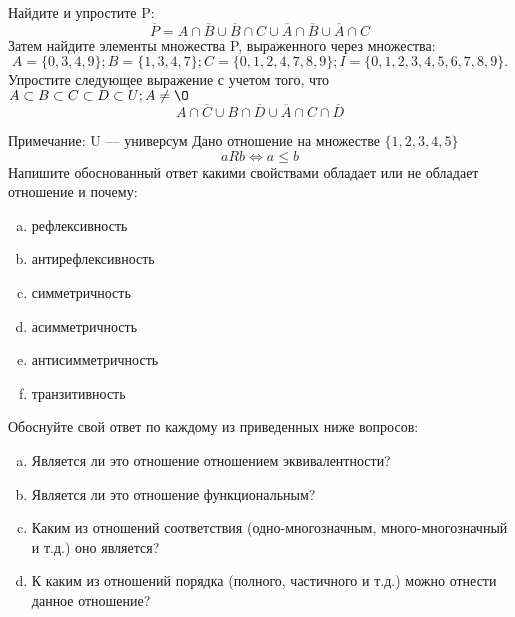 \documentclass[10pt]{exam}
\begin{document}
\begin{questions}
\question
Найдите и упростите P:
\begin{equation*}
\overline{P} = A \cap \overline{B} \cup \overline{B} \cap C \cup \overline{A} \cap \overline{B} \cup \overline{A} \cap C
\end{equation*}
Затем найдите элементы множества P, выраженного через множества:
\begin{equation*}
A = \{0, 3, 4, 9\}; 
B = \{1, 3, 4, 7\};
C = \{0, 1, 2, 4, 7, 8, 9\};
I = \{0, 1, 2, 3, 4, 5, 6, 7, 8, 9\}.
\end{equation*}\question
Упростите следующее выражение с учетом того, что $A\subset B \subset C \subset D \subset U; A \neq \O$
\begin{equation*}
A \cap  \overline{C} \cup B \cap \overline{D} \cup  \overline{A} \cap C \cap  \overline{D}
\end{equation*}

Примечание: U — универсум\question
Дано отношение на множестве $\{1, 2, 3, 4, 5\}$ 
\begin{equation*}
aRb \iff a \leq b
\end{equation*}
Напишите обоснованный ответ какими свойствами обладает или не обладает отношение и почему:   
\begin{enumerate} [a)]\setcounter{enumi}{0}
\item рефлексивность
\item антирефлексивность
\item симметричность
\item асимметричность
\item антисимметричность
\item транзитивность
\end{enumerate}

Обоснуйте свой ответ по каждому из приведенных ниже вопросов:
\begin{enumerate} [a)]\setcounter{enumi}{0}
    \item Является ли это отношение отношением эквивалентности?
    \item Является ли это отношение функциональным?
    \item Каким из отношений соответствия (одно-многозначным, много-многозначный и т.д.) оно является?
    \item К каким из отношений порядка (полного, частичного и т.д.) можно отнести данное отношение?
\end{enumerate}



\end{questions}
\end{document}
